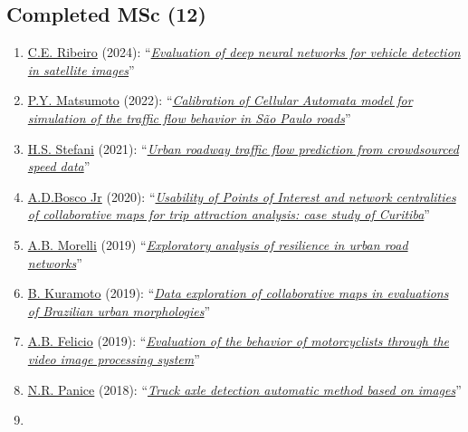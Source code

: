 \documentclass[
  10pt,
  a4paper,
  DIV=11,
  numbers=noendperiod]{scrartcl}
\begin{document}
\subsection{Completed MSc (12)}\label{completed-msc-12}

\begin{enumerate}
\def\labelenumi{\arabic{enumi}.}
\item
  \href{}{C.E. Ribeiro} (2024):
  ``\emph{\href{https://doi.org/10.11606/D.18.2024.tde-31102024-114415}{Evaluation
  of deep neural networks for vehicle detection in satellite images}}''
\item
  \href{https://lattes.cnpq.br/6933325479741942}{P.Y. Matsumoto} (2022):
  ``\emph{\href{https://doi.org/10.11606/D.18.2022.tde-18102022-103557}{Calibration
  of Cellular Automata model for simulation of the traffic flow behavior
  in São Paulo roads}}''
\item
  \href{https://lattes.cnpq.br/2263620972100266}{H.S. Stefani} (2021):
  ``\emph{\href{https://doi.org/10.11606/D.18.2021.tde-22082022-091919}{Urban
  roadway traffic flow prediction from crowdsourced speed data}}''
\item
  \href{https://lattes.cnpq.br/7512695029586698}{A.D.Bosco Jr} (2020):
  ``\emph{\href{https://doi.org/10.11606/D.18.2020.tde-18042022-143053}{Usability
  of Points of Interest and network centralities of collaborative maps
  for trip attraction analysis: case study of Curitiba}}''
\item
  \href{https://scholar.google.com.br/citations?user=BqdPZ2gAAAAJ}{A.B.
  Morelli} (2019)
  ``\emph{\href{https://doi.org/10.11606/D.18.2020.tde-13012020-153303}{Exploratory
  analysis of resilience in urban road networks}}''
\item
  \href{https://lattes.cnpq.br/3302815314452867}{B. Kuramoto} (2019):
  ``\emph{\href{https://doi.org/10.11606/D.18.2019.tde-20082019-084513}{Data
  exploration of collaborative maps in evaluations of Brazilian urban
  morphologies}}''
\item
  \href{https://lattes.cnpq.br/1581979506356539}{A.B. Felicio} (2019):
  ``\emph{\href{https://doi.org/10.11606/D.18.2020.tde-12052020-170835}{Evaluation
  of the behavior of motorcyclists through the video image processing
  system}}''
\item
  \href{https://lattes.cnpq.br/3462901770011968}{N.R. Panice} (2018):
  ``\emph{\href{https://doi.org/10.11606/D.18.2018.tde-11122018-213600}{Truck
  axle detection automatic method based on images}}''
\item

\end{enumerate}
\end{document}
